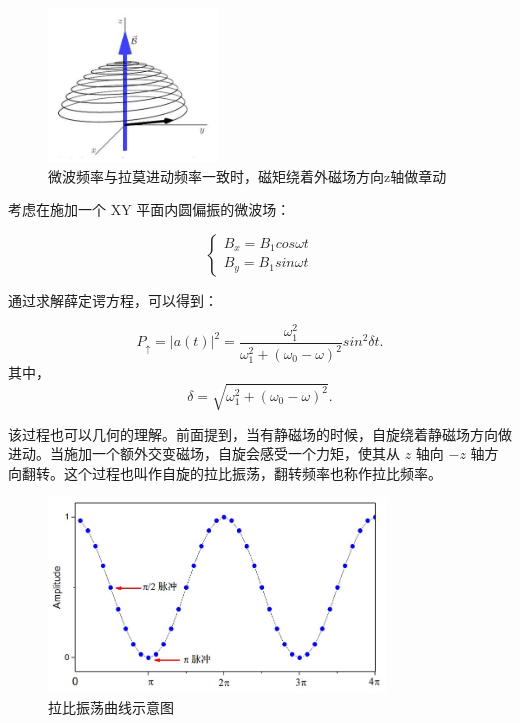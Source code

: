 \documentclass[a4paper,UTF8]{ctexart}
\begin{document}
\begin{figure}[H]
    \centering
    \begin{minipage}[b]{0.9\textwidth}
        \centering
        \includegraphics[width=0.4\textwidth]{./fig9.jpg}
        \caption{微波频率与拉莫进动频率一致时，磁矩绕着外磁场方向z轴做章动}
    \end{minipage}
\end{figure}

考虑在施加一个 XY 平面内圆偏振的微波场：

$$
\left\{\begin{array}{l}B_x=B_1cos\omega t\\[1ex]B_y=B_1sin\omega t\end{array}\right.
$$


通过求解薛定谔方程，可以得到：

$$
P_\uparrow=|a(t)|^2=\frac{\omega_1^2}{\omega_1^2+(\omega_0-\omega)^2}sin^2\delta t.
$$
其中，
$$
\delta=\sqrt{\omega_1^2+(\omega_0-\omega)^2}.
$$

该过程也可以几何的理解。前面提到，当有静磁场的时候，自旋绕着静磁场方向做进动。当施加一个额外交变磁场，自旋会感受一个力矩，使其从 $z$ 轴向 $-z$ 轴方向翻转。这个过程也叫作自旋的拉比振荡，翻转频率也称作拉比频率。

\begin{figure}[H]
    \centering
    \begin{minipage}[b]{0.9\textwidth}
        \centering
        \includegraphics[width=0.8\textwidth]{./fig10.jpg}
        \caption{拉比振荡曲线示意图}
    \end{minipage}
\end{figure}
\end{document}
